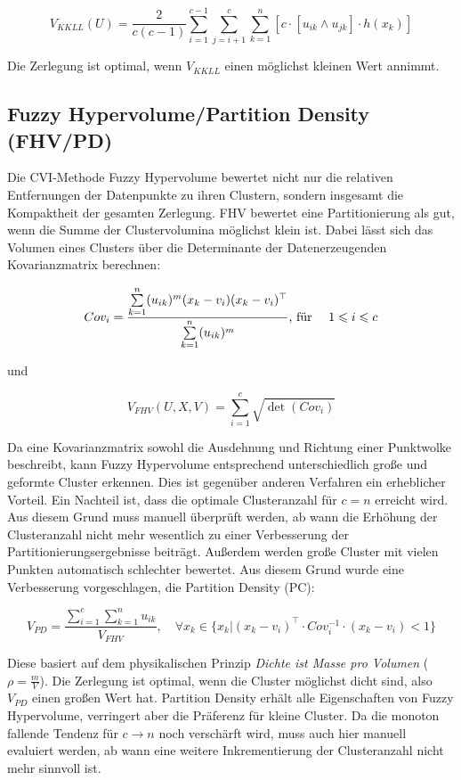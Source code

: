 \documentclass[11pt,ceqn]{book}
\begin{document}
$$V_{KKLL}(U) = \frac{2}{c(c-1)} \sum_{i=1}^{c-1} \sum_{j=i+1}^c \sum_{k=1}^n \left[c \cdot \left[u_{ik} \land u_{jk} \right]\cdot h(x_k)\right]$$

Die Zerlegung ist optimal, wenn $V_{KKLL}$ einen möglichst kleinen Wert annimmt.

\subsection{Fuzzy Hypervolume/Partition Density (FHV/PD)}
Die CVI-Methode Fuzzy Hypervolume \cite{fhv} bewertet nicht nur die relativen Entfernungen der Datenpunkte zu ihren Clustern, sondern insgesamt die Kompaktheit der gesamten Zerlegung. FHV bewertet eine Partitionierung als gut, wenn die Summe der Clustervolumina möglichst klein ist. Dabei lässt sich das Volumen eines Clusters über die Determinante der Datenerzeugenden Kovarianzmatrix berechnen: 

$$Cov_i = \frac{\sum\limits_{k=1}^n (u_{ik})^m (x_k-v_i)(x_k-v_i)^{\top}}{\sum\limits_{k=1}^n (u_{ik})^m} \text{,\ für \quad} 1\leqslant i\leqslant c$$

und

$$V_{FHV}(U,X,V) = \sum_{i=1}^c \sqrt{\det(Cov_i)}$$

Da eine Kovarianzmatrix sowohl die Ausdehnung und Richtung einer Punktwolke beschreibt, kann Fuzzy Hypervolume entsprechend unterschiedlich große und geformte Cluster erkennen. Dies ist gegenüber anderen Verfahren ein erheblicher Vorteil. Ein Nachteil ist, dass die optimale Clusteranzahl für $c=n$ erreicht wird. Aus diesem Grund muss manuell überprüft werden, ab wann die Erhöhung der Clusteranzahl nicht mehr wesentlich zu einer Verbesserung der Partitionierungsergebnisse beiträgt. Außerdem werden große Cluster mit vielen Punkten automatisch schlechter bewertet. Aus diesem Grund wurde eine Verbesserung vorgeschlagen, die Partition Density (PC):

$$V_{PD}=\frac{\sum\limits_{i=1}^c \sum\limits_{k=1}^n u_{ik}}{V_{FHV}},\quad \forall x_k \in \{x_k|(x_k-v_i)^{\top}\cdot Cov_i^{-1}\cdot(x_k-v_i)<1\}$$

Diese basiert auf dem physikalischen Prinzip \textit{Dichte ist Masse pro Volumen} ($\rho = \frac{m}{V}$). Die Zerlegung ist optimal, wenn die Cluster möglichst dicht sind, also $V_{PD}$ einen großen Wert hat. Partition Density erhält alle Eigenschaften von Fuzzy Hypervolume, verringert aber die Präferenz für kleine Cluster. Da die monoton fallende Tendenz für $c \rightarrow n$ noch verschärft wird, muss auch hier manuell evaluiert werden, ab wann eine weitere Inkrementierung der Clusteranzahl nicht mehr sinnvoll ist.
\end{document}
